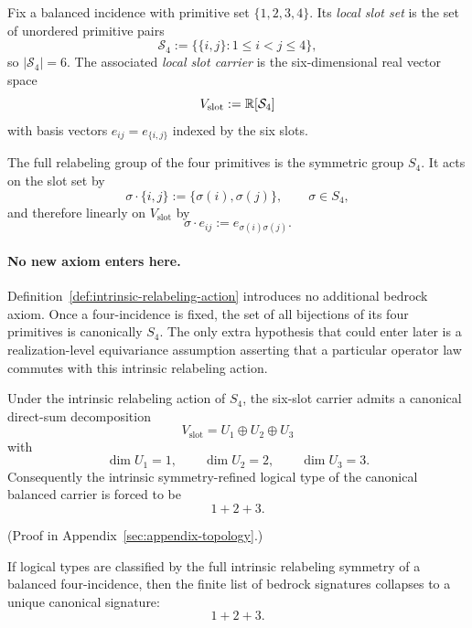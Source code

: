 \begin{definition}
\label{def:local-slot-carrier}
Fix a balanced incidence with primitive set $\{1,2,3,4\}$. Its \emph{local slot
set} is the set of unordered primitive pairs
\[
\mathcal S_4:=\{\{i,j\}:1\le i<j\le 4\},
\]
so $|\mathcal S_4|=6$. The associated \emph{local slot carrier} is the
six-dimensional real vector space
\[
V_{\mathrm{slot}}:=\mathbb{R}[\mathcal S_4]
\]
with basis vectors $e_{ij}=e_{\{i,j\}}$ indexed by the six slots.
\end{definition}

\begin{definition}
\label{def:intrinsic-relabeling-action}
The full relabeling group of the four primitives is the symmetric group
$S_4$. It acts on the slot set by
\[
\sigma\cdot \{i,j\}:=\{\sigma(i),\sigma(j)\},
\qquad
\sigma\in S_4,
\]
and therefore linearly on $V_{\mathrm{slot}}$ by
\[
\sigma\cdot e_{ij}:=e_{\sigma(i)\sigma(j)}.
\]
\end{definition}

\paragraph{No new axiom enters here.}
\label{rem:no-new-axiom-s4}
Definition~\ref{def:intrinsic-relabeling-action} introduces no additional
bedrock axiom. Once a four-incidence is fixed, the set of all bijections of
its four primitives is canonically $S_4$. The only extra hypothesis that could
enter later is a realization-level equivariance assumption asserting that a
particular operator law commutes with this intrinsic relabeling action.

\begin{theorem}
\label{thm:intrinsic-six-slot-decomposition}
Under the intrinsic relabeling action of $S_4$, the six-slot carrier admits a
canonical direct-sum decomposition
\[
V_{\mathrm{slot}}=U_1\oplus U_2\oplus U_3
\]
with
\[
\dim U_1=1,\qquad
\dim U_2=2,\qquad
\dim U_3=3.
\]
Consequently the intrinsic symmetry-refined logical type of the canonical
balanced carrier is forced to be
\[
1+2+3.
\]
\end{theorem}

(Proof in Appendix~\ref{sec:appendix-topology}.)

\begin{corollary}
\label{cor:intrinsic-symmetry-forces-123}
If logical types are classified by the full intrinsic relabeling symmetry of a
balanced four-incidence, then the finite list of bedrock signatures collapses
to a unique canonical signature:
\[
1+2+3.
\]
\end{corollary}

